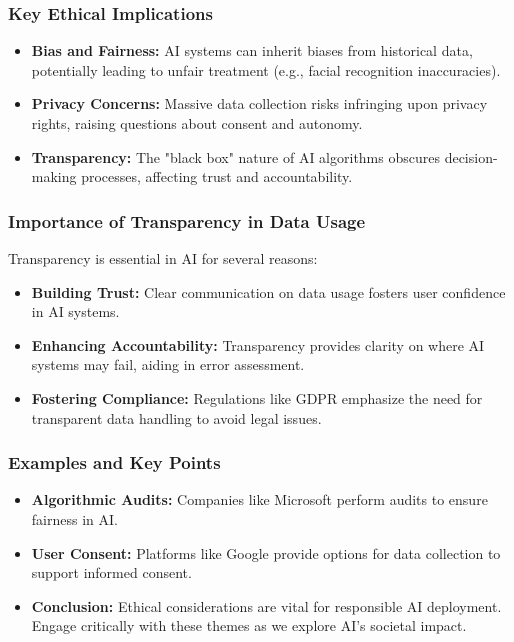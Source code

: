 \documentclass[aspectratio=169]{beamer}
\begin{document}
\begin{frame}[fragile]
    \frametitle{Key Ethical Implications}
    \begin{itemize}
        \item \textbf{Bias and Fairness:} AI systems can inherit biases from historical data, potentially leading to unfair treatment (e.g., facial recognition inaccuracies).
        \item \textbf{Privacy Concerns:} Massive data collection risks infringing upon privacy rights, raising questions about consent and autonomy.
        \item \textbf{Transparency:} The "black box" nature of AI algorithms obscures decision-making processes, affecting trust and accountability.
    \end{itemize}
\end{frame}

\begin{frame}[fragile]
    \frametitle{Importance of Transparency in Data Usage}
    Transparency is essential in AI for several reasons:
    \begin{itemize}
        \item \textbf{Building Trust:} Clear communication on data usage fosters user confidence in AI systems.
        \item \textbf{Enhancing Accountability:} Transparency provides clarity on where AI systems may fail, aiding in error assessment.
        \item \textbf{Fostering Compliance:} Regulations like GDPR emphasize the need for transparent data handling to avoid legal issues.
    \end{itemize}
\end{frame}

\begin{frame}[fragile]
    \frametitle{Examples and Key Points}
    \begin{itemize}
        \item \textbf{Algorithmic Audits:} Companies like Microsoft perform audits to ensure fairness in AI.
        \item \textbf{User Consent:} Platforms like Google provide options for data collection to support informed consent.
        \item \textbf{Conclusion:} Ethical considerations are vital for responsible AI deployment. Engage critically with these themes as we explore AI's societal impact.
    \end{itemize}
\end{frame}
\end{document}
